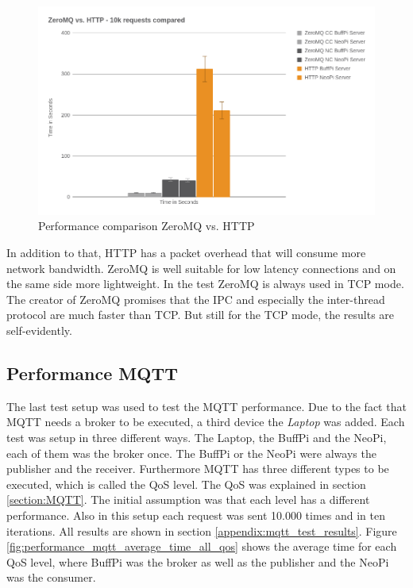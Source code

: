 \begin{figure}[H]
    \centering
    \includegraphics[width=\textwidth]{resources/images/performance_zeromq_vs_http.png}
    \caption[Performance comparison ZeroMQ vs. HTTP]{Performance comparison ZeroMQ vs. HTTP}
    \label{fig:performance_zeromq_vs_http}
\end{figure}

In addition to that, \ac{HTTP} has a packet overhead that will consume more network bandwidth.
ZeroMQ is well suitable for low latency connections and on the same side more lightweight.
In the test ZeroMQ is always used in \ac{TCP} mode.
The creator of ZeroMQ promises that the \ac{IPC} and especially the inter-thread protocol are much faster than \ac{TCP}.\autocite[cf.]{ZeroMQ:UicastTransports}
But still for the \ac{TCP} mode, the results are self-evidently.


\subsection{Performance MQTT}
The last test setup was used to test the MQTT performance.
Due to the fact that MQTT needs a broker to be executed, a third device the \textit{Laptop} was added.
Each test was setup in three different ways.
The Laptop, the BuffPi and the NeoPi, each of them was the broker once.
The BuffPi or the NeoPi were always the publisher and the receiver.
Furthermore MQTT has three different types to be executed, which is called the \ac{QoS} level.
The \ac{QoS} was explained in section \ref{section:MQTT}.
The initial assumption was that each level has a different performance.
Also in this setup each request was sent 10.000 times and in ten iterations.
All results are shown in section \ref{appendix:mqtt_test_results}.
Figure \ref{fig:performance_mqtt_average_time_all_qos} shows the average time for each \ac{QoS} level, where BuffPi was the broker as well as the publisher and the NeoPi was the consumer.

